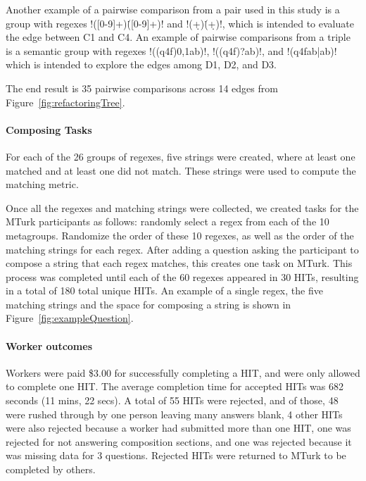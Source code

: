 Another example of a pairwise comparison from a pair used in this study is a group with regexes \cverb!([0-9]+)\.([0-9]+)! and  \cverb!(\d+)\.(\d+)!, which is intended to evaluate the edge between C1 and C4.
An example of pairwise comparisons from a triple is a semantic group with regexes \cverb!((q4f){0,1}ab)!, \cverb!((q4f)?ab)!, and \cverb!(q4fab|ab)! which is intended to explore the edges among D1, D2, and D3.

The end result is 35 pairwise comparisons across 14 edges from Figure~\ref{fig:refactoringTree}.

\paragraph{Composing Tasks}
For each of the 26 groups of regexes, five strings were created, where at least one matched and at least one did not match. These strings were used to compute the matching metric.

Once all the regexes and matching strings were collected, we created tasks for the MTurk participants as follows:
randomly select a regex from each of the 10 metagroups. Randomize the order of these 10 regexes, as well as the order of the matching strings for each regex. After adding a question asking the participant to compose a string that each regex matches, this creates one task on MTurk.   This process was completed until each of the 60 regexes appeared in 30 HITs, resulting in a total of 180 total unique HITs.
An example of a single regex, the five matching strings and the space for composing a string is shown in Figure~\ref{fig:exampleQuestion}.
\paragraph{Worker outcomes}
Workers were paid \$3.00 for successfully completing a HIT, and were only allowed to complete  one HIT.  The average completion time for accepted HITs was 682 seconds (11 mins, 22 secs).
A total of 55 HITs were rejected, and  of those, 48 were rushed through by one person leaving many answers blank, 4 other HITs were also rejected because a worker had submitted more than one HIT, one was rejected for not answering composition sections, and one was rejected because it was missing data for 3 questions.  Rejected HITs were returned to MTurk to be completed by others.
